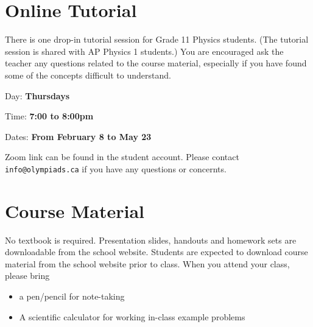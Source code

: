 \documentclass{../oss-handout}
\begin{document}
\section*{Online Tutorial}
There is one drop-in tutorial session for Grade 11 Physics students. (The
tutorial session is shared with AP Physics 1 students.) You are encouraged ask
the teacher any questions related to the course material, especially if you
have found some of the concepts difficult to understand.

\hspace{.5in}Day: \textbf{Thursdays}

\hspace{.5in}Time: \textbf{7:00 to 8:00pm}

\hspace{.5in}Dates: \textbf{From February 8 to May 23}

Zoom link can be found in the student account. Please contact
\texttt{info@olympiads.ca} if you have any questions or concernts.




\section*{Course Material}
No textbook is required. Presentation slides, handouts and homework sets are
downloadable from the school website. Students are expected to download course
material from the school website prior to class. When you attend your class,
please bring
\begin{itemize}[nosep]
\item a pen/pencil for note-taking
\item A scientific calculator for working in-class example problems
\end{itemize}
\end{document}
